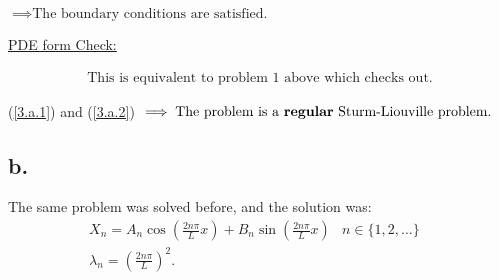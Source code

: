 \documentclass{article}
\begin{document}
\noindent
$\implies \text{The boundary conditions are satisfied.}$
\newline

\noindent
\underline{PDE form Check:}

\begin{align}
  \text{This is equivalent to problem 1 above which checks out.} \label{3.a.2}
\end{align}
\newline

\noindent
(\ref{3.a.1}) and (\ref{3.a.2}) $\implies \text{The problem is a \textbf{regular} Sturm-Liouville problem}.$
\newline

\subsection*{b.}
The same problem was solved before, and the solution was:
\begin{align*}
  &X_n = A_n \cos\left(\frac{2n\pi}{L} x\right) + B_n \sin\left(\frac{2n\pi}{L} x\right) & n \in \{1,2, \dots\} &&\\
  & \lambda_n = \left(\frac{2n\pi}{L}\right)^2.
\end{align*}
\newpage
\end{document}
